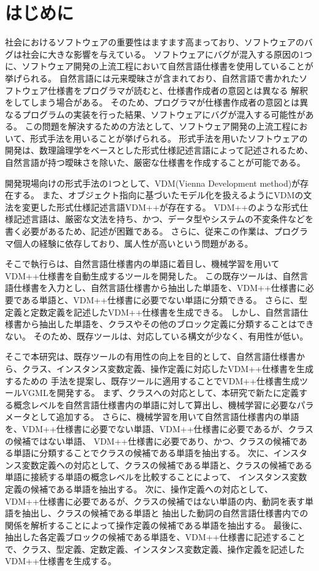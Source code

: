 \chapter{はじめに}
\label{cha:Introduction}

社会におけるソフトウェアの重要性はますます高まっており、ソフトウェアのバグは社会に大きな影響を与えている\cite{cite1,cite2}。
ソフトウェアにバグが混入する原因の1つに、ソフトウェア開発の上流工程において自然言語仕様書を使用していることが挙げられる。
自然言語には元来曖昧さが含まれており、自然言語で書かれたソフトウェア仕様書をプログラマが読むと、仕様書作成者の意図とは異なる
解釈をしてしまう場合がある\cite{cite3}。
そのため、プログラマが仕様書作成者の意図とは異なるプログラムの実装を行った結果、ソフトウェアにバグが混入する可能性がある。
この問題を解決するための方法として、ソフトウェア開発の上流工程において、形式手法を用いることが挙げられる\cite{cite4}。
形式手法を用いたソフトウェアの開発は、数理論理学をベースとした形式仕様記述言語によって記述されるため、
自然言語が持つ曖昧さを除いた、厳密な仕様書を作成することが可能である\cite{cite5}。

開発現場向けの形式手法の1つとして、VDM(Vienna Development method)が存在する\cite{vdm}。
また、オブジェクト指向に基づいたモデル化を扱えるようにVDMの文法を変更した形式仕様記述言語VDM++が存在する\cite{vdm}。
VDM++のような形式仕様記述言語は、厳密な文法を持ち、かつ、データ型やシステムの不変条件などを書く必要があるため、記述が困難である。
さらに、従来この作業は、プログラマ個人の経験に依存しており、属人性が高いという問題がある。

そこで執行らは、自然言語仕様書内の単語に着目し、機械学習を用いてVDM++仕様書を自動生成するツールを開発した\cite{shigyo1,shigyo2,shigyo3,shigyo4}。
この既存ツールは、自然言語仕様書を入力とし、自然言語仕様書から抽出した単語を、VDM++仕様書に必要である単語と、VDM++仕様書に必要でない単語に分類できる。
さらに、型定義と定数定義を記述したVDM++仕様書を生成できる。
しかし、自然言語仕様書から抽出した単語を、クラスやその他のブロック定義に分類することはできない。
そのため、既存ツールは、対応している構文が少なく、有用性が低い。

そこで本研究は、既存ツールの有用性の向上を目的として、自然言語仕様書から、クラス、インスタンス変数定義、操作定義に対応したVDM++仕様書を生成するための
手法を提案し、既存ツールに適用することでVDM++仕様書生成ツールVGMLを開発する。
まず、クラスへの対応として、本研究で新たに定義する概念レベルを自然言語仕様書内の単語に対して算出し、機械学習に必要なパラメータとして追加する。
さらに、機械学習を用いて自然言語仕様書内の単語を、VDM++仕様書に必要でない単語、VDM++仕様書に必要であるが、クラスの候補ではない単語、
VDM++仕様書に必要であり、かつ、クラスの候補である単語に分類することでクラスの候補である単語を抽出する。
次に、インスタンス変数定義への対応として、クラスの候補である単語と、クラスの候補である単語に接続する単語の概念レベルを比較することによって、
インスタンス変数定義の候補である単語を抽出する。
次に、操作定義への対応として、VDM++仕様書に必要であるが、クラスの候補ではない単語の内、動詞を表す単語を抽出し、クラスの候補である単語と
抽出した動詞の自然言語仕様書内での関係を解析することによって操作定義の候補である単語を抽出する。
最後に、抽出した各定義ブロックの候補である単語を、VDM++仕様書に記述することで、クラス、型定義、定数定義、インスタンス変数定義、操作定義を記述した
VDM++仕様書を生成する。


